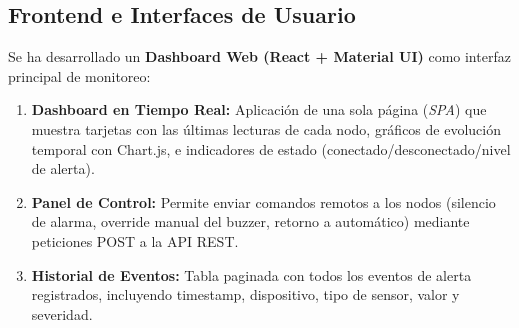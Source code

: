 \subsection{Frontend e Interfaces de Usuario}
Se ha desarrollado un \textbf{Dashboard Web (React + Material UI)} como interfaz principal de monitoreo:
\begin{enumerate}
    \item \textbf{Dashboard en Tiempo Real:} Aplicaci\'on de una sola p\'agina (\textit{SPA}) que muestra tarjetas con las \'ultimas lecturas de cada nodo, gr\'aficos de evoluci\'on temporal con Chart.js, e indicadores de estado (conectado/desconectado/nivel de alerta).
    \item \textbf{Panel de Control:} Permite enviar comandos remotos a los nodos (silencio de alarma, override manual del buzzer, retorno a autom\'atico) mediante peticiones POST a la API REST.
    \item \textbf{Historial de Eventos:} Tabla paginada con todos los eventos de alerta registrados, incluyendo timestamp, dispositivo, tipo de sensor, valor y severidad.
\end{enumerate}


